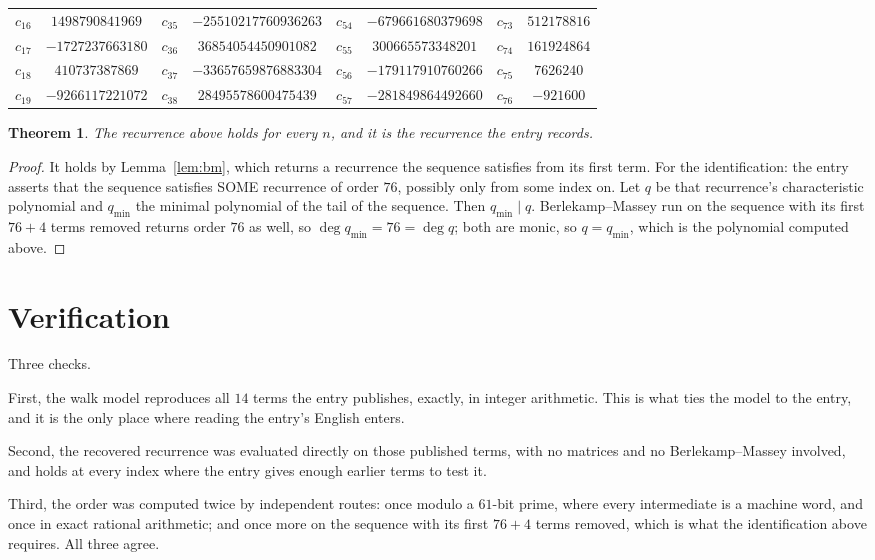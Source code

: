 \documentclass[11pt,a4paper]{article}
\theoremstyle{plain}
\newtheorem{theorem}{Theorem}
\theoremstyle{definition}
\begin{document}
\begin{center}
\begin{tabular}{cccccccc}
$c_{16}$ & $1498790841969$ & $c_{35}$ & $-25510217760936263$ & $c_{54}$ & $-679661680379698$ & $c_{73}$ & $512178816$ \\
$c_{17}$ & $-1727237663180$ & $c_{36}$ & $36854054450901082$ & $c_{55}$ & $300665573348201$ & $c_{74}$ & $161924864$ \\
$c_{18}$ & $410737387869$ & $c_{37}$ & $-33657659876883304$ & $c_{56}$ & $-179117910760266$ & $c_{75}$ & $7626240$ \\
$c_{19}$ & $-9266117221072$ & $c_{38}$ & $28495578600475439$ & $c_{57}$ & $-281849864492660$ & $c_{76}$ & $-921600$ \\
\end{tabular}
\end{center}

\begin{theorem}
The recurrence above holds for every $n$, and it is the recurrence the entry records.
\end{theorem}

\begin{proof}
It holds by Lemma~\ref{lem:bm}, which returns a recurrence the sequence satisfies from its
first term. For the identification: the entry asserts that the sequence satisfies SOME
recurrence of order $76$, possibly only from some index on. Let $q$ be that recurrence's
characteristic polynomial and $q_{\min}$ the minimal polynomial of the tail of the sequence.
Then $q_{\min}\mid q$. Berlekamp--Massey run on the sequence with its first $76+4$ terms
removed returns order $76$ as well, so $\deg q_{\min}=76=\deg q$; both are monic, so
$q=q_{\min}$, which is the polynomial computed above.
\end{proof}

\section{Verification}

Three checks.

First, the walk model reproduces all $14$ terms the entry publishes, exactly, in integer
arithmetic. This is what ties the model to the entry, and it is the only place where reading
the entry's English enters.

Second, the recovered recurrence was evaluated directly on those published terms, with no
matrices and no Berlekamp--Massey involved, and holds at every index where the entry gives
enough earlier terms to test it.

Third, the order was computed twice by independent routes: once modulo a $61$-bit prime, where
every intermediate is a machine word, and once in exact rational arithmetic; and once more on
the sequence with its first $76+4$ terms removed, which is what the identification above
requires. All three agree.
\end{document}
